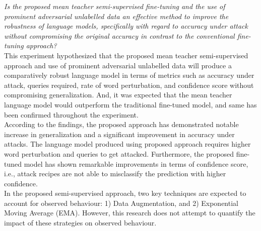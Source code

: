 \documentclass[%
	BCOR=8mm, %
	DIV=12,
	toc=bibliography, %
	toc=listof, %
	oneside, %
	egregdoesnotlikesansseriftitles, %
	]{scrbook}
\begin{document}
\emph{Is the proposed mean teacher semi-supervised fine-tuning and the use of prominent adversarial unlabelled data an effective method to improve the robustness of language models, specifically with regard to accuracy under attack without compromising the original accuracy in contrast to the conventional fine-tuning approach?}\\

This experiment hypothesized that the proposed mean teacher semi-supervised approach and use of prominent adversarial unlabelled data will produce a comparatively robust language model in terms of metrics such as accuracy under attack, queries required, rate of word perturbation, and confidence score without compromising generalization. And, it  was expected that the mean teacher language model would outperform the traditional fine-tuned model, and same has been confirmed throughout the experiment.\\
According to the findings, the proposed approach has demonstrated notable increase in generalization and a significant improvement in accuracy under attacks. The language model produced using proposed approach requires higher word perturbation and queries to get attacked. Furthermore, the proposed fine-tuned model has shown remarkable improvements in terms of confidence score, i.e., attack recipes are not able to misclassify the prediction with higher confidence.\\
In the proposed semi-supervised approach, two key techniques are expected to account for observed behaviour: 1) Data Augmentation, and 2) Exponential Moving Average (EMA). However, this research does not attempt to quantify the impact of these strategies on observed behaviour. 
\end{document}
